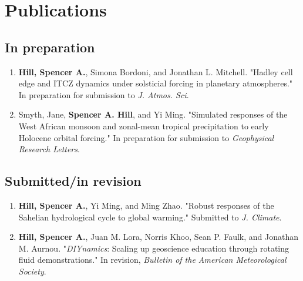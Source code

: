 \documentclass[12pt,letterpaper]{shillcv}
\begin{document}
\section*{Publications}
\label{sec:orgc84a421}
\subsection*{In preparation}
\label{sec:org9054b1d}
\begin{enumerate}
\item \textbf{Hill, Spencer A.}, Simona Bordoni, and Jonathan L. Mitchell.  "Hadley cell
edge and ITCZ dynamics under solsticial forcing in planetary atmospheres."
In preparation for submission to \emph{J. Atmos. Sci}.
\item Smyth, Jane, \textbf{Spencer A. Hill}, and Yi Ming.  "Simulated responses of the
West African monsoon and zonal-mean tropical precipitation to early Holocene
orbital forcing."  In preparation for submission to \emph{Geophysical Research
Letters}.
\end{enumerate}
\subsection*{Submitted/in revision}
\label{sec:org8aac630}
\begin{enumerate}
\item \textbf{Hill, Spencer A.}, Yi Ming, and Ming Zhao.  "Robust responses of the
Sahelian hydrological cycle to global warming."  Submitted to \emph{J. Climate}.
\item \textbf{Hill, Spencer A.}, Juan M. Lora, Norris Khoo, Sean P. Faulk, and Jonathan M.
Aurnou.  "\emph{DIYnamics}: Scaling up geoscience education through rotating fluid
demonstrations."  In revision, \emph{Bulletin of the American Meteorological
Society}.
\end{enumerate}
\end{document}
